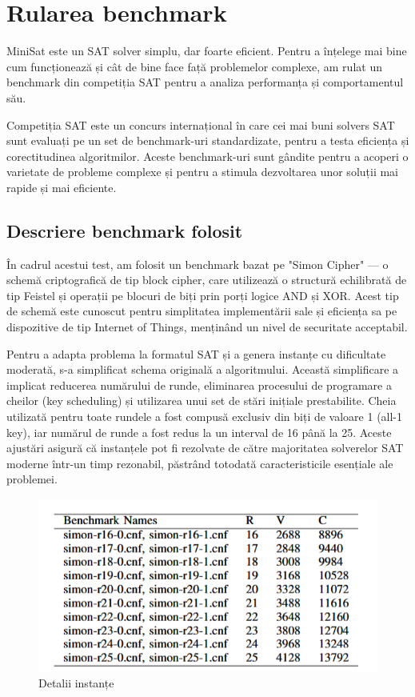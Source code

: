 \documentclass[runningheads]{llncs}
\begin{document}
\section{Rularea benchmark}
 
MiniSat este un SAT solver simplu, dar foarte eficient. Pentru a înțelege mai bine cum funcționează și cât de bine face față problemelor complexe, am rulat un benchmark din competiția SAT pentru a analiza performanța și comportamentul său. 
 
Competiția SAT \cite {satcompetition} este un concurs internațional în care cei mai buni solvers SAT sunt evaluați pe un set de benchmark-uri standardizate, pentru a testa eficiența și corectitudinea algoritmilor. Aceste benchmark-uri sunt gândite pentru a acoperi o varietate de probleme complexe și pentru a stimula dezvoltarea unor soluții mai rapide și mai eficiente.

 \subsection{Descriere benchmark folosit}
În cadrul acestui test, am folosit un benchmark bazat pe "Simon Cipher" — o schemă criptografică de tip block cipher, care utilizează o structură echilibrată de tip Feistel și operații pe blocuri de biți prin porți logice AND și XOR. Acest tip de schemă este cunoscut pentru simplitatea implementării sale și eficiența sa pe dispozitive de tip Internet of Things, menținând un nivel de securitate acceptabil.

Pentru a adapta problema la formatul SAT și a genera instanțe cu dificultate moderată, s-a simplificat schema originală a algoritmului. Această simplificare a implicat reducerea numărului de runde, eliminarea procesului de programare a cheilor (key scheduling) și utilizarea unui set de stări inițiale prestabilite. Cheia utilizată pentru toate rundele a fost compusă exclusiv din biți de valoare 1 (all-1 key), iar numărul de runde a fost redus la un interval de 16 până la 25. Aceste ajustări asigură că instanțele pot fi rezolvate de către majoritatea solverelor SAT moderne într-un timp rezonabil, păstrând totodată caracteristicile esențiale ale problemei.

\begin{figure}
    \centering
    \includegraphics[width=0.5\linewidth]{images/benchmark/tabel date.png}
    \caption{Detalii instanțe}
    \label{fig:enter-label}
\end{figure}
\end{document}
